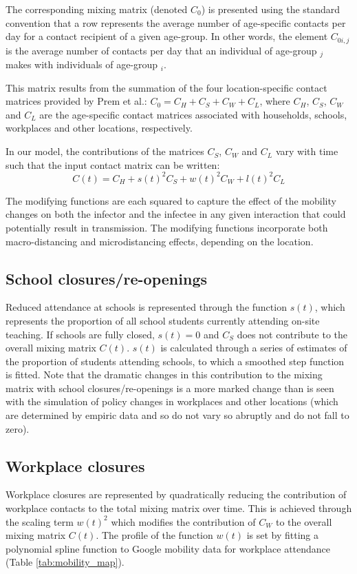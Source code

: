 The corresponding mixing matrix (denoted \(C_{0}\)) is presented using the standard convention that a row represents the average number of age-specific contacts per day for a contact recipient of a given age-group. In other words, the element \(C_{0i,j}\) is the average number of contacts per day that an individual of age-group \(_{j}\) makes with individuals of age-group \(_{i}\).

This matrix results from the summation of the four location-specific contact matrices provided by Prem et al.: \(C_{0}=C_{H}+C_{S}+C_{W}+C_{L}\), where \(C_{H}\), \(C_{S}\), \(C_{W}\) and \(C_{L}\) are the age-specific contact matrices associated with households, schools, workplaces and other locations, respectively.

In our model, the contributions of the matrices \(C_{S}\), \(C_{W}\) and \(C_{L}\) vary with time such that the input contact matrix can be written:
\[C(t)= C_{H}+ s(t)^{2}C_{S}+ w(t)^{2}C_{W}+l(t)^{2}C_{L}\]

The modifying functions are each squared to capture the effect of the mobility changes on both the infector and the infectee in any given interaction that could potentially result in transmission. The modifying functions incorporate both macro-distancing and microdistancing effects, depending on the location.

\subsection{School closures/re-openings}
Reduced attendance at schools is represented through the function \(s(t)\), which represents the proportion of all school students currently attending on-site teaching. If schools are fully closed, \(s(t)=0\) and \(C_{S}\) does not contribute to the overall mixing matrix \(C(t)\). \(s(t)\) is calculated through a series of estimates of the proportion of students attending schools, to which a smoothed step function is fitted. Note that the dramatic changes in this contribution to the mixing matrix with school closures/re-openings is a more marked change than is seen with the simulation of policy changes in workplaces and other locations (which are determined by empiric data and so do not vary so abruptly and do not fall to zero).

\subsection{Workplace closures}
Workplace closures are represented by quadratically reducing the contribution of workplace contacts to the total mixing matrix over time. This is achieved through the scaling term \(w(t)^{2}\) which modifies the contribution of \(C_{W}\) to the overall mixing matrix \(C(t)\). The profile of the function \(w(t)\) is set by fitting a polynomial spline function to Google mobility data for workplace attendance (Table \ref{tab:mobility_map}).

